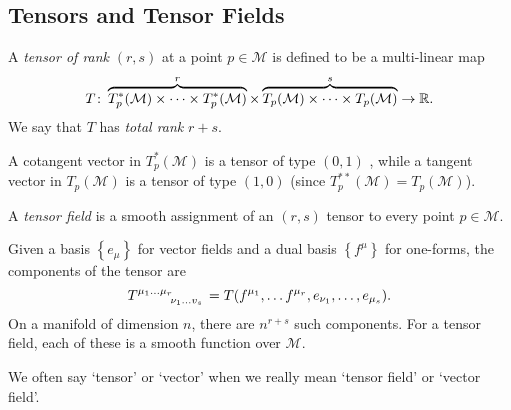 \subsection{Tensors and Tensor Fields}%
\label{sub:tensors_and_tensor_fields}

\begin{definition}[]
  A \emph{tensor of rank} $(r, s)$  at a point $p \in \mathcal{M}$  is defined to be a multi-linear map
  \begin{equation}
    T\colon \overbrace{T_p^*(\mathcal{M}) \times \dots \times T_p^*(\mathcal{M})}^{\mathclap{r}} \times \overbrace{T_p(\mathcal{M}) \times \dots \times T_p(\mathcal{M})}^{\mathclap{s}} \to \mathbb{R}.
  \end{equation}
  We say that $T$ has \emph{total rank} $r + s$.
\end{definition}

A cotangent vector in $T_p^*(\mathcal{M})$  is a tensor of type $(0, 1)$ , while a tangent vector in $T_p(\mathcal{M})$  is a tensor of type $(1, 0)$ (since $T_p^{**}(\mathcal{M}) = T_p(\mathcal{M})$).

\begin{definition}[]
  A \emph{tensor field} is a smooth assignment of an $(r, s)$ tensor to every point $p \in \mathcal{M}$.
\end{definition}

Given a basis $\left\{ e_{\mu} \right\}$ for vector fields and a dual basis $\left\{ f^{\mu} \right\}$ for one-forms, the components of the tensor are
\begin{equation}
  T\indices{^{\mu_1 \dots \mu_r}_{\nu_1 \dots v_{s}}} = T(f^{\mu_1}, \dots f^{\mu_r}, e_{\nu_1}, \dots, e_{\mu_s}).
\end{equation}
On a manifold of dimension $n$, there are $n^{r+s}$ such components. For a tensor field, each of these is a smooth function over $\mathcal{M}$.

\begin{leftbar}
  \begin{remark}
    We often say `tensor' or `vector' when we really mean `tensor field' or `vector field'.
  \end{remark}
\end{leftbar}
